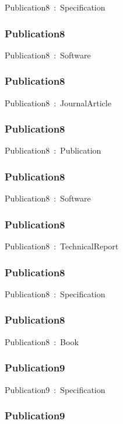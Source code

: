 \documentclass{article}
\begin{document}
Publication8~:~Specification

\subsubsection*{Publication8}

Publication8~:~Software

\subsubsection*{Publication8}

Publication8~:~JournalArticle

\subsubsection*{Publication8}

Publication8~:~Publication

\subsubsection*{Publication8}

Publication8~:~Software

\subsubsection*{Publication8}

Publication8~:~TechnicalReport

\subsubsection*{Publication8}

Publication8~:~Specification

\subsubsection*{Publication8}

Publication8~:~Book

\subsubsection*{Publication9}

Publication9~:~Specification

\subsubsection*{Publication9}
\end{document}
